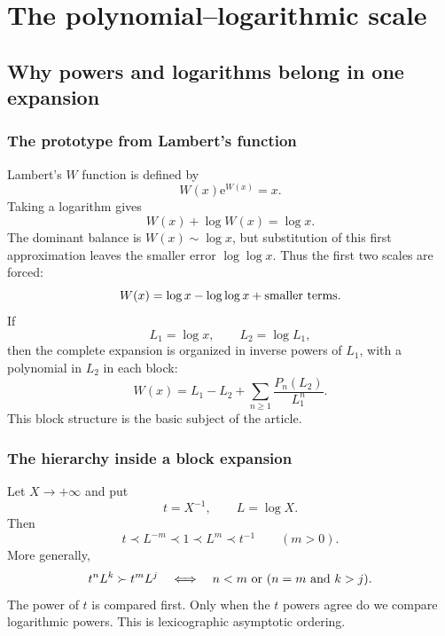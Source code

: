 \documentclass[11pt,oneside]{book}
\theoremstyle{definition}
\theoremstyle{remark}
\newcommand{\e}{\mathrm e}
\newcommand{\precdom}{\prec}
\newcommand{\succdom}{\succ}
\begin{document}
\tableofcontents

\mainmatter

\part{The polynomial--logarithmic scale}

\chapter{Why powers and logarithms belong in one expansion}
\label{ch:scale}

\section{The prototype from Lambert's function}
Lambert's $W$ function is defined by
\begin{equation}\label{eq:W-def-intro}
 W(x)\e^{W(x)}=x.
\end{equation}
Taking a logarithm gives
\begin{equation}\label{eq:W-log-intro}
 W(x)+\log W(x)=\log x.
\end{equation}
The dominant balance is $W(x)\sim\log x$, but substitution of this first
approximation leaves the smaller error $\log\log x$.  Thus the first two
scales are forced:
\[
 W(x)=\log x-\log\log x+\hbox{smaller terms}.
\]
If
\[
 L_1=\log x,\qquad L_2=\log L_1,
\]
then the complete expansion is organized in inverse powers of $L_1$, with a
polynomial in $L_2$ in each block:
\begin{equation}\label{eq:W-shape-intro}
 W(x)=L_1-L_2+\sum_{n\ge1}\frac{P_n(L_2)}{L_1^n}.
\end{equation}
This block structure is the basic subject of the article.

\section{The hierarchy inside a block expansion}
Let $X\to+\infty$ and put
\[
 t=X^{-1},\qquad L=\log X.
\]
Then
\[
 t\precdom L^{-m}\precdom 1\precdom L^m\precdom t^{-1}
 \qquad(m>0).
\]
More generally,
\begin{equation}\label{eq:monomial-order}
 t^nL^k\succdom t^mL^j
 \quad\Longleftrightarrow\quad
 n<m\ \hbox{or}\ (n=m\ \hbox{and}\ k>j).
\end{equation}
The power of $t$ is compared first.  Only when the $t$ powers agree do we
compare logarithmic powers.  This is lexicographic asymptotic ordering.
\end{document}
